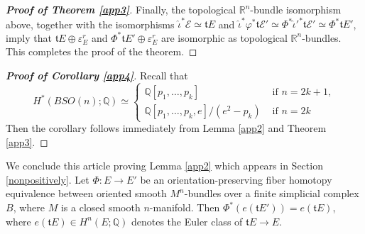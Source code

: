 \documentclass[onecolumn,notitlepage,11pt]{article}
\newcommand{\Q}{\mathbb{Q}}
\newcommand{\R}{\mathbb{R}}
\newcommand{\beq}{\begin{equation*}}
\newcommand{\eeq}{\end{equation*}}
\newenvironment{customlemma}[1]
  {\renewcommand\theinnercustomlemma{#1}\innercustomlemma}
  {\endinnercustomlemma}
\theoremstyle{definition}
\begin{document}
\begin{proof}[\textbf{Proof of Theorem \ref{app3}}]
Finally, the topological $\R^n$-bundle isomorphism above, together with the 
isomorphisms $\hat{\iota}^*\mathfrak{\mathcal{E}}\simeq\mathfrak{t}E$ and
$\hat{\iota}^*\varphi^*\mathfrak{t}\mathcal{E'}\simeq
\Phi^*\hat{\iota}'^*\mathfrak{t}\mathcal{E}'\simeq
\Phi^*\mathfrak{t}E'$, imply that
$\mathfrak{t}E\oplus\varepsilon_E^r$ and
$\Phi^*\mathfrak{t}E'\oplus\varepsilon_E^r$ are isomorphic as topological
$\R^n$-bundles. This completes the proof of the theorem.
\end{proof}
\begin{proof}[\textbf{Proof of Corollary \ref{app4}}]
Recall that 
\beq
H^*(BSO(n);\Q)\simeq
\begin{cases}
\Q[p_1,\ldots,p_k] & \text{  if  } n=2k+1,\\
\Q[p_1,\ldots,p_k,e]/(e^2-p_k)  & \text{  if  } n=2k
\end{cases}
\eeq 
Then the corollary follows immediately from Lemma
\ref{app2} and Theorem \ref{app3}.
\end{proof}
We conclude this article proving Lemma \ref{app2} which appears in
Section \ref{nonpositively}.
\begin{customlemma}{\ref{app2}}
Let $\Phi:E\to E'$ be an orientation-preserving 
fiber homotopy equivalence between
oriented smooth $M^n$-bundles
over a finite simplicial complex $B$,
where $M$ is a closed smooth $n$-manifold. Then 
$\Phi^*(e(\mathfrak{t}E'))=e(\mathfrak{t}E)$, where 
$e(\mathfrak{t}E)\in H^{n}(E;\Q)$
denotes the Euler class of $\mathfrak{t}E\to E$.
\end{customlemma}
\end{document}
